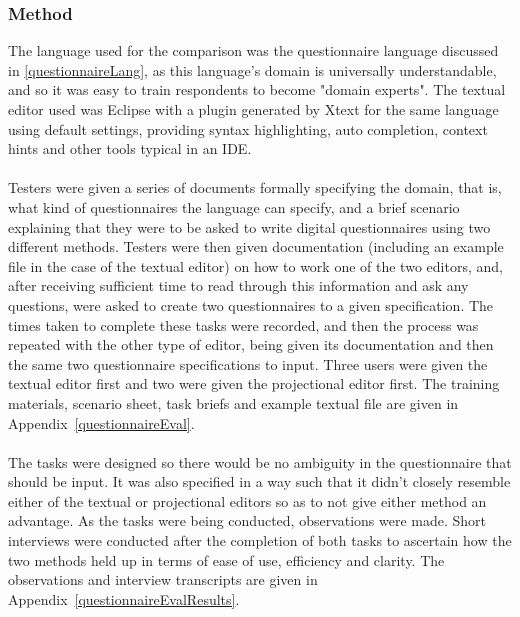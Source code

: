 \documentclass{article}
\begin{document}
{\subsubsection{Method}
The language used for the comparison was the questionnaire language discussed in \ref{questionnaireLang}, as this language's domain is universally understandable, and so it was easy to train respondents to become "domain experts". The textual editor used was Eclipse with a plugin generated by Xtext for the same language using default settings, providing syntax highlighting, auto completion, context hints and other tools typical in an IDE.
\\
\\
Testers were given a series of documents formally specifying the domain, that is, what kind of  questionnaires the language can specify, and a brief scenario explaining that they were to be asked to write digital questionnaires using two different methods. Testers were then given documentation (including an example file in the case of the textual editor) on how to work one of the two editors, and, after receiving sufficient time to read through this information and ask any questions, were asked to create two questionnaires to a given specification. The times taken to complete these tasks were recorded, and then the process was repeated with the other type of editor, being given its documentation and then the same two questionnaire specifications to input. Three users were given the textual editor first and two were given the projectional editor first. The training materials, scenario sheet, task briefs and example textual file are given in Appendix~\ref{questionnaireEval}.
\\
\\
The tasks were designed so there would be no ambiguity in the questionnaire that should be input. It was also specified in a way such that it didn't closely resemble either of the textual or projectional editors so as to not give either method an advantage. As the tasks were being conducted, observations were made. Short interviews were conducted after the completion of both tasks to ascertain how the two methods held up in terms of ease of use, efficiency and clarity. The observations and interview transcripts are given in Appendix~\ref{questionnaireEvalResults}.

}
\end{document}
